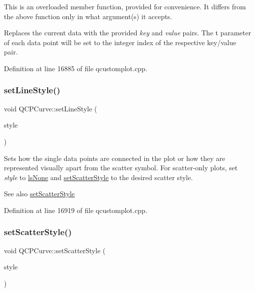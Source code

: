 This is an overloaded member function, provided for convenience. It differs from the above function only in what argument(s) it accepts.

Replaces the current data with the provided {\itshape key} and {\itshape value} pairs. The t parameter of each data point will be set to the integer index of the respective key/value pair. 

Definition at line 16885 of file qcustomplot.\+cpp.

\mbox{\label{class_q_c_p_curve_a4a377ec863ff81a1875c3094a6177c19}} 
\subsubsection{\texorpdfstring{set\+Line\+Style()}{setLineStyle()}}
{\footnotesize\ttfamily void Q\+C\+P\+Curve\+::set\+Line\+Style (\begin{DoxyParamCaption}\item[{\hyperlink{class_q_c_p_curve_a2710e9f79302152cff794c6e16cc01f1}{Q\+C\+P\+Curve\+::\+Line\+Style}}]{style }\end{DoxyParamCaption})}

Sets how the single data points are connected in the plot or how they are represented visually apart from the scatter symbol. For scatter-\/only plots, set {\itshape style} to \hyperlink{class_q_c_p_curve_a2710e9f79302152cff794c6e16cc01f1aec1601a191cdf0b4e761c4c66092cc48}{ls\+None} and \hyperlink{class_q_c_p_curve_a55e43b44709bf50a35500644988aa706}{set\+Scatter\+Style} to the desired scatter style.

\begin{DoxySeeAlso}{See also}
\hyperlink{class_q_c_p_curve_a55e43b44709bf50a35500644988aa706}{set\+Scatter\+Style} 
\end{DoxySeeAlso}


Definition at line 16919 of file qcustomplot.\+cpp.

\mbox{\label{class_q_c_p_curve_a55e43b44709bf50a35500644988aa706}} 
\subsubsection{\texorpdfstring{set\+Scatter\+Style()}{setScatterStyle()}}
{\footnotesize\ttfamily void Q\+C\+P\+Curve\+::set\+Scatter\+Style (\begin{DoxyParamCaption}\item[{const \hyperlink{class_q_c_p_scatter_style}{Q\+C\+P\+Scatter\+Style} \&}]{style }\end{DoxyParamCaption})}

